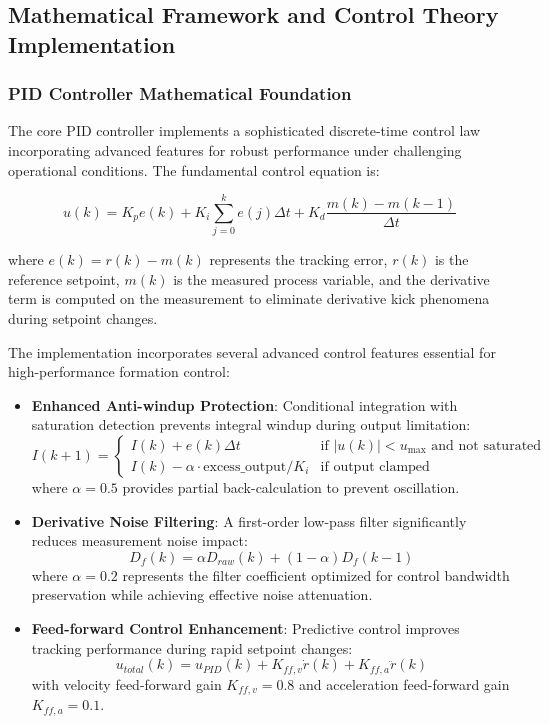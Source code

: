 \subsection*{Mathematical Framework and Control Theory Implementation}

\subsubsection*{PID Controller Mathematical Foundation}

The core PID controller implements a sophisticated discrete-time control law incorporating advanced features for robust performance under challenging operational conditions. The fundamental control equation is:

\begin{equation}
u(k) = K_p e(k) + K_i \sum_{j=0}^{k} e(j) \Delta t + K_d \frac{m(k) - m(k-1)}{\Delta t}
\end{equation}

where $e(k) = r(k) - m(k)$ represents the tracking error, $r(k)$ is the reference setpoint, $m(k)$ is the measured process variable, and the derivative term is computed on the measurement to eliminate derivative kick phenomena during setpoint changes.

The implementation incorporates several advanced control features essential for high-performance formation control:

\begin{itemize}
    \item \textbf{Enhanced Anti-windup Protection}: Conditional integration with saturation detection prevents integral windup during output limitation:
    \begin{equation}
    I(k+1) = \begin{cases}
    I(k) + e(k) \Delta t & \text{if } |u(k)| < u_{\max} \text{ and not saturated} \\
    I(k) - \alpha \cdot \text{excess\_output} / K_i & \text{if output clamped}
    \end{cases}
    \end{equation}
    where $\alpha = 0.5$ provides partial back-calculation to prevent oscillation.

    \item \textbf{Derivative Noise Filtering}: A first-order low-pass filter significantly reduces measurement noise impact:
    \begin{equation}
    D_f(k) = \alpha D_{raw}(k) + (1-\alpha) D_f(k-1)
    \end{equation}
    where $\alpha = 0.2$ represents the filter coefficient optimized for control bandwidth preservation while achieving effective noise attenuation.

    \item \textbf{Feed-forward Control Enhancement}: Predictive control improves tracking performance during rapid setpoint changes:
    \begin{equation}
    u_{total}(k) = u_{PID}(k) + K_{ff,v} \dot{r}(k) + K_{ff,a} \ddot{r}(k)
    \end{equation}
    with velocity feed-forward gain $K_{ff,v} = 0.8$ and acceleration feed-forward gain $K_{ff,a} = 0.1$.
\end{itemize}

